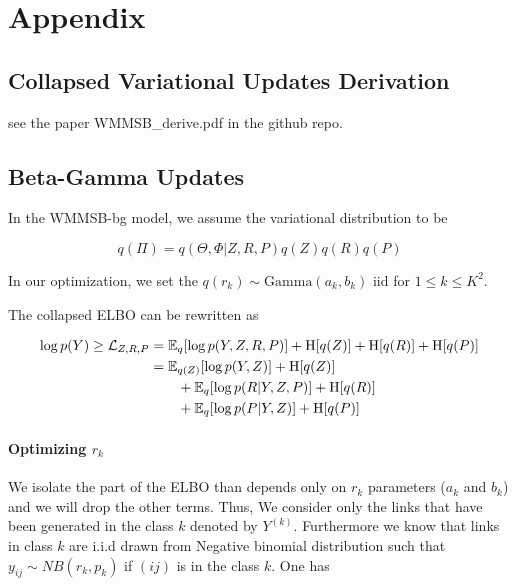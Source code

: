 \section{Appendix}
\label{sec:append}


\subsection{Collapsed Variational Updates Derivation}

see the paper WMMSB\_derive.pdf in the github repo.

\subsection{Beta-Gamma Updates}

In the WMMSB-bg model, we assume the variational distribution to be 

\begin{equation*}
q(\Pi) = q(\Theta, \Phi|Z, R, P) q(Z)q(R)q(P)
\end{equation*}

In our optimization, we set the $q(r_k) \sim \mathrm{Gamma}(a_k, b_k)$ iid for $1\leq k \leq K^2$. 

The collapsed ELBO can be rewritten as 

\begin{align*}
\log p(Y) \geq \mathcal{L}_{Z,R,P} &= \mathbb{E}_{q}[\log p(Y, Z, R, P)] + \textrm{H}[q(Z)] + \textrm{H}[q(R)] + \textrm{H}[q(P)] \\
                        &=  \mathbb{E}_{q(Z)}[\log p(Y, Z)] + \textrm{H}[q(Z)] \\
                        &\qquad + \mathbb{E}_{q}[\log p(R|Y,Z,P)] + \textrm{H}[q(R)] \\
                        &\qquad +\mathbb{E}_{q}[\log p(P|Y,Z)] + \textrm{H}[q(P)] 
\end{align*}

\paragraph{Optimizing $r_k$}

We isolate the part of the ELBO than depends only on $r_k$ parameters ($a_k$ and $b_k$) and we will drop the other terms. Thus, We consider only the links that have been generated in the class $k$ denoted by $Y^{(k)}$. Furthermore we know that links in class $k$ are i.i.d drawn from  Negative binomial distribution such that $y_{ij} \sim NB(r_k, p_k)$ if $(ij)$ is in the class $k$. One has

